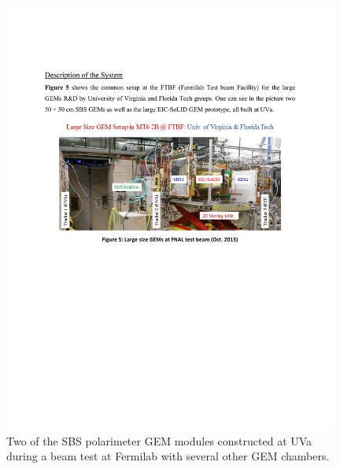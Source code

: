 \begin{figure}[h]
  \begin{center}
    \includegraphics[width=0.98\textwidth]{figures/Fermilab_GEM_setup.pdf}
  \end{center}
  \caption{\label{GEMs} Two of the SBS polarimeter GEM modules constructed at UVa during a beam test at Fermilab with several other GEM chambers.}
\end{figure} 

